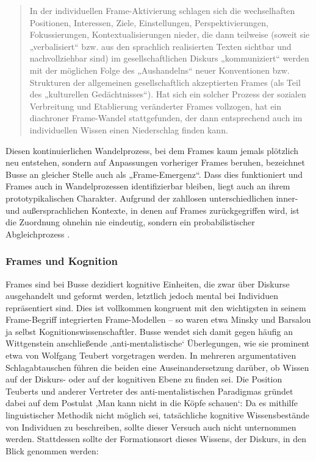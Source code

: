 \begin{quote}
In der individuellen Frame-Aktivierung schlagen sich die wechselhaften Positionen, Interessen, Ziele, Einstellungen, Perspektivierungen, Fokussierungen, Kontextualisierungen nieder, die dann teilweise (soweit sie „verbalisiert`` bzw. aus den sprachlich realisierten Texten sichtbar und nachvollziehbar sind) im gesellschaftlichen Diskurs „kommuniziert`` werden mit der möglichen Folge des „Aushandelns`` neuer Konventionen bzw. Strukturen der allgemeinen gesellschaftlich akzeptierten Frames (als Teil des „kulturellen Gedächtnisses``). Hat sich ein solcher Prozess der sozialen Verbreitung und Etablierung veränderter Frames vollzogen, hat ein diachroner Frame-Wandel stattgefunden, der dann entsprechend auch im individuellen Wissen einen Niederschlag finden kann. \autocite[627]{busseFrameSemantikKompendium2012}
\end{quote}

Diesen kontinuierlichen Wandelprozess, bei dem Frames kaum jemals plötzlich neu entstehen, sondern auf Anpassungen vorheriger Frames beruhen, bezeichnet Busse an gleicher Stelle auch als „Frame-Emergenz``. Dass dies funktioniert und Frames auch in Wandelprozessen identifizierbar bleiben, liegt auch an ihrem prototypikalischen Charakter. Aufgrund der zahllosen unterschiedlichen inner- und außersprachlichen Kontexte, in denen auf Frames zurückgegriffen wird, ist die Zuordnung ohnehin nie eindeutig, sondern ein probabilistischer Abgleichprozess \autocite[624]{busseFrameSemantikKompendium2012}.

\subsubsection{Frames und Kognition}\label{frames-und-kognition}

Frames sind bei Busse dezidiert kognitive Einheiten, die zwar über Diskurse ausgehandelt und geformt werden, letztlich jedoch mental bei Individuen repräsentiert sind. Dies ist vollkommen kongruent mit den wichtigsten in seinem Frame-Begriff integrierten Frame-Modellen -- so waren etwa Minsky und Barsalou ja selbst Kognitionswissenschaftler. Busse wendet sich damit gegen häufig an Wittgenstein anschließende ‚anti-mentalistische` Überlegungen, wie sie prominent etwa von Wolfgang Teubert vorgetragen werden. In mehreren argumentativen Schlagabtauschen \autocites{teubertWirklichkeitDiskurses2013, busseDiskursSpracheGesellschaftliches2013, teubertDietrichBusseUnd2018, teubertImKopfOder2019}[siehe auch][]{ziemSprachbegabteMenschIst2018} führen die beiden eine Auseinandersetzung darüber, ob Wissen auf der Diskurs- oder auf der kognitiven Ebene zu finden sei. Die Position Teuberts und anderer Vertreter des anti-mentalistischen Paradigmas gründet dabei auf dem Postulat ‚Man kann nicht in die Köpfe schauen`: Da es mithilfe linguistischer Methodik nicht möglich sei, tatsächliche kognitive Wissensbestände von Individuen zu beschreiben, sollte dieser Versuch auch nicht unternommen werden. Stattdessen sollte der Formationsort dieses Wissens, der Diskurs, in den Blick genommen werden:

